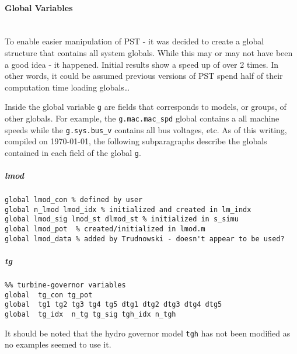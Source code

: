 \documentclass[12pt]{article}
\begin{document}
\pagebreak
\paragraph{Global Variables} \ \\
To enable easier manipulation of PST - it was decided to create a global structure that contains all system globals.
While this may or may not have been a good idea - it happened.
Initial results show a speed up of over 2 times.
In other words, it could be assumed previous versions of PST spend half of their computation time loading globals\ldots


Inside the global variable \verb|g| are fields that corresponds to models, or groups, of other globals.
For example, the \verb|g.mac.mac_spd| global contains a all machine speeds while the \verb|g.sys.bus_v| contains all bus voltages, etc.
As of this writing, compiled on \today, the following subparagraphs describe the globals contained in each field of the global \verb|g|. 

\subparagraph{lmod}
\begin{verbatim}
global lmod_con % defined by user
global n_lmod lmod_idx % initialized and created in lm_indx
global lmod_sig lmod_st dlmod_st % initialized in s_simu
global lmod_pot  % created/initialized in lmod.m 
global lmod_data % added by Trudnowski - doesn't appear to be used?
\end{verbatim}

\subparagraph{tg}
\begin{verbatim}
%% turbine-governor variables
global  tg_con tg_pot
global  tg1 tg2 tg3 tg4 tg5 dtg1 dtg2 dtg3 dtg4 dtg5
global  tg_idx  n_tg tg_sig tgh_idx n_tgh
\end{verbatim}
It should be noted that the hydro governor model \verb|tgh| has not been modified as no examples seemed to use it.
\end{document}
